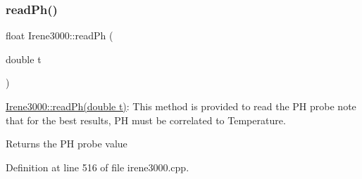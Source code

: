\subsubsection{\texorpdfstring{read\+Ph()}{readPh()}}
{\footnotesize\ttfamily float Irene3000\+::read\+Ph (\begin{DoxyParamCaption}\item[{double}]{t }\end{DoxyParamCaption})}

\hyperlink{class_irene3000_a436fc0a06681cd0784aba56b9707f19a}{Irene3000\+::read\+Ph(double t)}\+: This method is provided to read the PH probe note that for the best results, PH must be correlated to Temperature.

\begin{DoxyReturn}{Returns}
the PH probe value 
\end{DoxyReturn}


Definition at line 516 of file irene3000.\+cpp.


